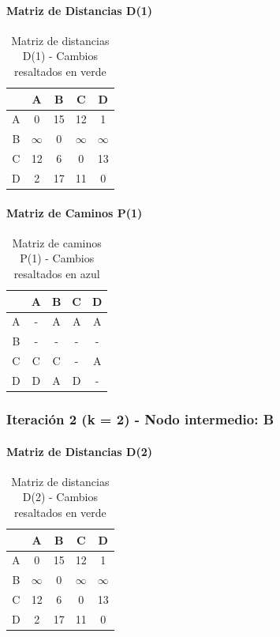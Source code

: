 \documentclass[12pt]{article}
\begin{document}
\paragraph{Matriz de Distancias D(1)}
\begin{table}[h!]
\centering
\begin{tabular}{|c|c|c|c|c|}
\hline
 & A & B & C & D \\\hline
A & 0 & 15 & 12 & 1 \\\hline
B & $\infty$ & 0 & $\infty$ & $\infty$ \\\hline
C & 12 & 6 & 0 & \cellcolor{lightgreen} 13 \\\hline
D & 2 & \cellcolor{lightgreen} 17 & 11 & 0 \\\hline
\end{tabular}
\caption{Matriz de distancias D(1) - Cambios resaltados en verde}
\end{table}

\paragraph{Matriz de Caminos P(1)}
\begin{table}[h!]
\centering
\begin{tabular}{|c|c|c|c|c|}
\hline
 & A & B & C & D \\\hline
A & - & A & A & A \\\hline
B & - & - & - & - \\\hline
C & C & C & - & \cellcolor{lightblue} A \\\hline
D & D & \cellcolor{lightblue} A & D & - \\\hline
\end{tabular}
\caption{Matriz de caminos P(1) - Cambios resaltados en azul}
\end{table}

\clearpage
\subsubsection{Iteración 2 (k = 2) - Nodo intermedio: B}
\paragraph{Matriz de Distancias D(2)}
\begin{table}[h!]
\centering
\begin{tabular}{|c|c|c|c|c|}
\hline
 & A & B & C & D \\\hline
A & 0 & 15 & 12 & 1 \\\hline
B & $\infty$ & 0 & $\infty$ & $\infty$ \\\hline
C & 12 & 6 & 0 & 13 \\\hline
D & 2 & 17 & 11 & 0 \\\hline
\end{tabular}
\caption{Matriz de distancias D(2) - Cambios resaltados en verde}
\end{table}
\end{document}
